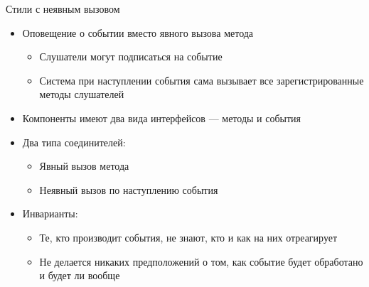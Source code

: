 \documentclass{../../slides-style}
\begin{document}
    \begin{frame}{Стили с неявным вызовом}
        \begin{itemize}
            \item Оповещение о событии вместо явного вызова метода
            \begin{itemize}
                \item Слушатели могут подписаться на событие
                \item Система при наступлении события сама вызывает все зарегистрированные методы слушателей
            \end{itemize}
            \item Компоненты имеют два вида интерфейсов --- методы и события
            \item Два типа соединителей:
            \begin{itemize}
                \item Явный вызов метода
                \item Неявный вызов по наступлению события
            \end{itemize}
            \item Инварианты:
            \begin{itemize}
                \item Те, кто производит события, не знают, кто и как на них отреагирует
                \item Не делается никаких предположений о том, как событие будет обработано и будет ли вообще
            \end{itemize}
        \end{itemize}
    \end{frame}
\end{document}
